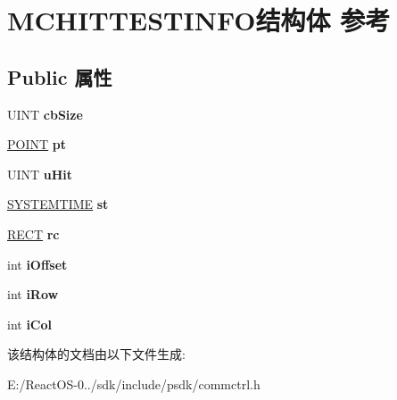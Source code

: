 \hypertarget{struct_m_c_h_i_t_t_e_s_t_i_n_f_o}{}\section{M\+C\+H\+I\+T\+T\+E\+S\+T\+I\+N\+F\+O结构体 参考}
\label{struct_m_c_h_i_t_t_e_s_t_i_n_f_o}
\subsection*{Public 属性}
\begin{DoxyCompactItemize}
\item 
\mbox{\label{struct_m_c_h_i_t_t_e_s_t_i_n_f_o_a26c336d01ed8a7dea0417d2ee274f6ae}} 
U\+I\+NT {\bfseries cb\+Size}
\item 
\mbox{\label{struct_m_c_h_i_t_t_e_s_t_i_n_f_o_abc83d417d160058d7ae74c58d7f13c71}} 
\hyperlink{structtag_p_o_i_n_t}{P\+O\+I\+NT} {\bfseries pt}
\item 
\mbox{\label{struct_m_c_h_i_t_t_e_s_t_i_n_f_o_adb46b7e2bc8e9c3a5611050d261af7ce}} 
U\+I\+NT {\bfseries u\+Hit}
\item 
\mbox{\label{struct_m_c_h_i_t_t_e_s_t_i_n_f_o_a2d49e29524503bb63853aff4ee277246}} 
\hyperlink{struct___s_y_s_t_e_m_t_i_m_e}{S\+Y\+S\+T\+E\+M\+T\+I\+ME} {\bfseries st}
\item 
\mbox{\label{struct_m_c_h_i_t_t_e_s_t_i_n_f_o_aaf15dc1e4d4959b528fee10d7144a9bb}} 
\hyperlink{structtag_r_e_c_t}{R\+E\+CT} {\bfseries rc}
\item 
\mbox{\label{struct_m_c_h_i_t_t_e_s_t_i_n_f_o_a43f73fe22ac858d0eada63ea63c3163e}} 
int {\bfseries i\+Offset}
\item 
\mbox{\label{struct_m_c_h_i_t_t_e_s_t_i_n_f_o_a4fccbc27bae20b6b7ba33924fc6a540c}} 
int {\bfseries i\+Row}
\item 
\mbox{\label{struct_m_c_h_i_t_t_e_s_t_i_n_f_o_a5407a5fa65ef8eb2b7a7b0976c1e5ffe}} 
int {\bfseries i\+Col}
\end{DoxyCompactItemize}


该结构体的文档由以下文件生成\+:\begin{DoxyCompactItemize}
\item 
E\+:/\+React\+O\+S-\/0../sdk/include/psdk/commctrl.\+h\end{DoxyCompactItemize}
